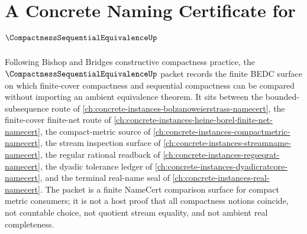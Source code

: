 \chapter{A Concrete Naming Certificate for $\CompactnessSequentialEquivalenceUp$}
\label{ch:concrete-instances-compactness-sequential-equivalence-namecert}

Following Bishop and Bridges constructive compactness practice, the $\CompactnessSequentialEquivalenceUp$ packet records the finite BEDC surface on which finite-cover compactness and sequential compactness can be compared without importing an ambient equivalence theorem. It sits between the bounded-subsequence route of \autoref{ch:concrete-instances-bolzanoweierstrass-namecert}, the finite-cover finite-net route of \autoref{ch:concrete-instances-heine-borel-finite-net-namecert}, the compact-metric source of \autoref{ch:concrete-instances-compactmetric-namecert}, the stream inspection surface of \autoref{ch:concrete-instances-streamname-namecert}, the regular rational readback of \autoref{ch:concrete-instances-regseqrat-namecert}, the dyadic tolerance ledger of \autoref{ch:concrete-instances-dyadicratcore-namecert}, and the terminal real-name seal of \autoref{ch:concrete-instances-real-namecert}. The packet is a finite NameCert comparison surface for compact metric consumers; it is not a host proof that all compactness notions coincide, not countable choice, not quotient stream equality, and not ambient real completeness.

